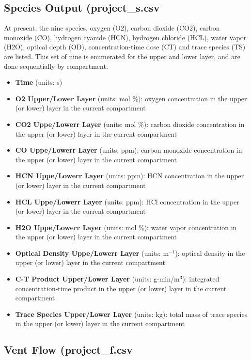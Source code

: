 \subsection{Species Output (project\_s.csv}

At present, the nine species, oxygen (O2), carbon dioxide (CO2), carbon monoxide (CO),  hydrogen cyanide (HCN), hydrogen chloride (HCL), water vapor (H2O), optical depth (OD), concentration-time dose (CT) and trace species (TS) are listed. This set of nine is enumerated for the upper and lower layer, and are done sequentially by compartment.

\begin{itemize}
\item \textbf{Time} (units: s)
\item \textbf{O2 Upper/Lower Layer} (units: mol \%): oxygen concentration in the upper (or lower) layer in the current compartment
\item \textbf{CO2 Uppe/Lowerr Layer} (units: mol \%):  carbon dioxide concentration in the upper (or lower) layer in the current compartment
\item \textbf{CO Uppe/Lowerr Layer} (units: ppm):  carbon monoxide concentration in the upper (or lower) layer in the current compartment
\item \textbf{HCN Uppe/Lowerr Layer} (units: ppm):  HCN concentration in the upper (or lower) layer in the current compartment
\item \textbf{HCL Uppe/Lowerr Layer} (units: ppm):  HCl concentration in the upper (or lower) layer in the current compartment
\item \textbf{H2O Uppe/Lowerr Layer} (units: mol \%):  water vapor concentration in the upper (or lower) layer in the current compartment
\item \textbf{Optical Density Uppe/Lowerr Layer} (units: m$^{-1}$):  optical density in the upper (or lower) layer in the current compartment
\item \textbf{C-T Product Upper/Lower Layer} (units: g-min/m$^3$):  integrated concentration-time product in the upper (or lower) layer in the current compartment
\item \textbf{Trace Species Upper/Lower Layer} (units: kg):  total mass of trace species in the upper (or lower) layer in the current compartment
\end{itemize}

\subsection{Vent Flow (project\_f.csv}

